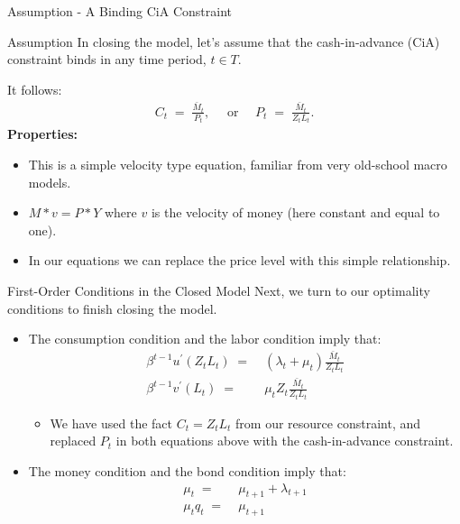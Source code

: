 \documentclass[10pt,c,aspectratio=1610,handout]{beamer}
\begin{document}
\begin{frame}{Assumption - A Binding CiA Constraint}%
  \begin{block}{Assumption}%
    In closing the model, let's assume that the cash-in-advance (CiA) constraint binds in any time period, $t \in T$.%
  \end{block}%
  \pause%
  It follows:%
  \begin{align}%
    C_{t} \; = \; \frac{\bar{M}_{t}}{P_{t}}, \quad \text{ or } \quad P_{t} \; = \; \frac{\bar{M}_{t}}{Z_{t}L_{t}}.\label{bind cia}%
  \end{align}%
  \pause%
  \textbf{Properties:}%
  \begin{itemize}%
    \item[$\blacktriangleright$]  This is a simple velocity type equation, familiar from very old-school macro models.%
    \item[$\blacktriangleright$] $M \ast v=P \ast Y$ where $v$ is the velocity of money {\footnotesize(here constant and equal to one)}.%
    \item[$\blacktriangleright$] In our equations we can replace the price level with this simple relationship.%
  \end{itemize}%
\end{frame}%
\begin{frame}{First-Order Conditions in the Closed Model}%
  Next, we turn to our optimality conditions to finish closing the model.%
  \begin{itemize}%
    \item[$\blacktriangleright$] The consumption condition and the labor condition imply that:%
    \begin{align}%
      \beta^{t-1} u^{\prime} (Z_{t}L_{t}) \; = & \; \left( \lambda_{t} + \mu_{t} \right) \frac{\bar{M}_{t}}{Z_{t}L_{t}}\label{eq:foc_consumption}\\%
      \beta^{t-1} v^{\prime} (L_{t}) \; = & \; \mu_{t} Z_{t} \frac{\bar{M}_{t}}{Z_{t}L_{t}}\label{eq:foc_labor}%
    \end{align}%
    \vspace*{-0.1in}%
    \begin{itemize}%
      \item[$\rightarrow$] We have used the fact $C_{t}=Z_{t}L_{t}$ from our resource constraint, and replaced $P_t$ in both equations above with the cash-in-advance constraint.%
    \end{itemize}%
    \vspace*{0.1in}%
    \pause%
    \item[$\blacktriangleright$] The money condition and the bond condition imply that:%
    \begin{align}%
      \mu_{t} \; = & \; \mu_{t+1} + \lambda_{t+1}\label{eq:foc_money}\\%
      \mu_{t} q_{t} \; = & \; \mu_{t+1}\label{eq:foc_bonds}%
    \end{align}%
  \end{itemize}%
\end{frame}%
\end{document}
